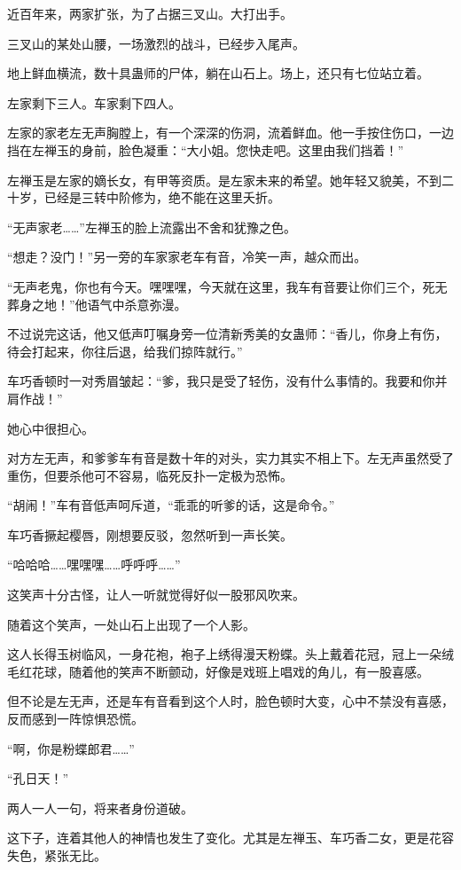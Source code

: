 \begin{this_body}
近百年来，两家扩张，为了占据三叉山。大打出手。

三叉山的某处山腰，一场激烈的战斗，已经步入尾声。

地上鲜血横流，数十具蛊师的尸体，躺在山石上。场上，还只有七位站立着。

左家剩下三人。车家剩下四人。

左家的家老左无声胸膛上，有一个深深的伤洞，流着鲜血。他一手按住伤口，一边挡在左禅玉的身前，脸色凝重：“大小姐。您快走吧。这里由我们挡着！”

左禅玉是左家的嫡长女，有甲等资质。是左家未来的希望。她年轻又貌美，不到二十岁，已经是三转中阶修为，绝不能在这里夭折。

“无声家老……”左禅玉的脸上流露出不舍和犹豫之色。

“想走？没门！”另一旁的车家家老车有音，冷笑一声，越众而出。

“无声老鬼，你也有今天。嘿嘿嘿，今天就在这里，我车有音要让你们三个，死无葬身之地！”他语气中杀意弥漫。

不过说完这话，他又低声叮嘱身旁一位清新秀美的女蛊师：“香儿，你身上有伤，待会打起来，你往后退，给我们掠阵就行。”

车巧香顿时一对秀眉皱起：“爹，我只是受了轻伤，没有什么事情的。我要和你并肩作战！”

她心中很担心。

对方左无声，和爹爹车有音是数十年的对头，实力其实不相上下。左无声虽然受了重伤，但要杀他可不容易，临死反扑一定极为恐怖。

“胡闹！”车有音低声呵斥道，“乖乖的听爹的话，这是命令。”

车巧香撅起樱唇，刚想要反驳，忽然听到一声长笑。

“哈哈哈……嘿嘿嘿……呼呼呼……”

这笑声十分古怪，让人一听就觉得好似一股邪风吹来。

随着这个笑声，一处山石上出现了一个人影。

这人长得玉树临风，一身花袍，袍子上绣得漫天粉蝶。头上戴着花冠，冠上一朵绒毛红花球，随着他的笑声不断颤动，好像是戏班上唱戏的角儿，有一股喜感。

但不论是左无声，还是车有音看到这个人时，脸色顿时大变，心中不禁没有喜感，反而感到一阵惊惧恐慌。

“啊，你是粉蝶郎君……”

“孔日天！”

两人一人一句，将来者身份道破。

这下子，连着其他人的神情也发生了变化。尤其是左禅玉、车巧香二女，更是花容失色，紧张无比。


\end{this_body}
